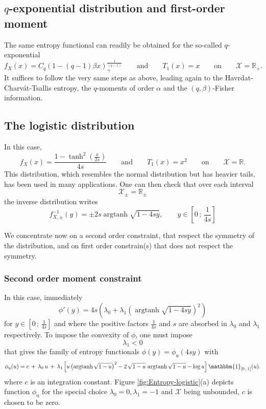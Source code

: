 \documentclass[english,sort&compress]{elsarticle}
\theoremstyle{definition}
\theoremstyle{plain}
\theoremstyle{plain}
\def\Rset{\mathbb{R}}
\def\X{\mathcal{X}}
\def\un{\mathbbm{1}}
\def\argtanh{\operatorname{argtanh}}
\begin{document}

\subsection{$q$-exponential distribution and first-order moment}
\label{subsec:qExponentialFirstOrder}

The  same  entropy  functional  can   readily  be  obtained  for  the  so-called
$q$-exponential
% 
\[
f_X(x)  =  C_q \left(  1  -  (q-1)  \beta x  \right)_+^{\frac{1}{(q-1)}}  \qquad
\mbox{and} \qquad T_1(x) = x \qquad \mbox{on} \qquad \X = \Rset_+.
\]
%
It  suffices to  follow  the very  same steps  as  above, leading  again to  the
Havrdat-Charv\'at-Tsallis  entropy, the  $q$-moments of  order $\alpha$  and the
$(q,\beta)$-Fisher information.



\subsection{The logistic distribution}
\label{subsec:Logistic}

In this case, 
%
\[
f_X(x)  = \frac{1  -  \tanh^2\!\left(\frac{x}{2s}\right)}{4s} \qquad  \mbox{and}
\qquad T_1(x) = x^2 \qquad \mbox{on} \qquad \X = \Rset.
\]
This  distribution, which  resembles  the normal  distribution  but has  heavier
tails, has  been used in  many applications. One  can then check that  over each
interval
%
\[
\X_\pm = \Rset_\pm
\]
%
the inverse distribution writes 
%
\[
f_{X,\pm}^{-1}(y) = \pm 2 s \argtanh \sqrt{1-4sy}, \qquad y \in \left[ 0 \, ; \,
  \frac{1}{4s} \right]
\]

We concentrate  now on a second  order constraint, that respect  the symmetry of
the  distribution, and on  first order  constrain(s) that  does not  respect the
symmetry.



\subsubsection{Second order moment constraint}

In this case, immediately 
%
\[
\phi'(y)  =  4  s  \left(  \lambda_0  +  \lambda_1  \left(  \argtanh\sqrt{1-4sy}
  \right)^2 \right)
\]
%
for $y \in \left[ 0 \, ; \, \frac{1}{4s} \right]$ and where the positive factors
$\frac{1}{4   s}$  and  $s$   are  absorbed   in  $\lambda_0$   and  $\lambda_1$
respectively.  To impose the convexity of $\phi$, one must impose
%
\[
\lambda_1 < 0
\]
%
that gives  the family of  entropy functionals $\phi(y) =  \phi_{\mathrm{u}}(4 s
y)$ with
%
\[
\phi_{\mathrm{u}}(u) = c \,  + \,  \lambda_0 \, u  \, +  \, \lambda_1  \left[ u
  \left( \argtanh\sqrt{1-u} \right)^2 -  2 \, \sqrt{1-u} \, \argtanh\sqrt{1-u} -
  \log u \right] \un_{\left[ 0 \, ; \, 1 \right]}(u).
\]
%
where  $c$  is an  integration  constant.  Figure  \ref{fig:Entropy-logistic}(a)
depicts  function $\phi_{\mathrm{u}}$  for the  special choice  $\lambda_0  = 0,
\lambda_1 = -1$ and $\X$ being unbounded, $c$ is chosen to be zero.
\end{document}
